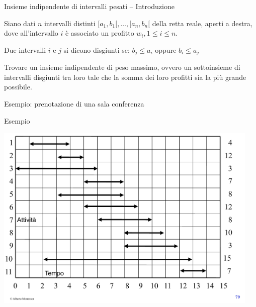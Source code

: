 \begin{frame}{Insieme indipendente di intervalli pesati -- Introduzione}

Siano dati $n$ intervalli distinti $[a_1, b_1[, \ldots, [a_n,b_n[$ della retta reale, aperti a destra, dove all’intervallo $i$ è associato un profitto $w_i, 1 \leq i \leq n$. 

\bigskip
{}
Due intervalli $i$ e $j$ si dicono \alert{disgiunti} se:  $b_j \leq a_i$  oppure  $b_i \leq a_j$

\bigskip
{}
Trovare un \alert{insieme indipendente di peso massimo}, ovvero un sottoinsieme di intervalli disgiunti tra loro tale che la somma dei loro profitti sia la più
grande possibile.
\BI
\item Esempio: prenotazione di una sala conferenza
\EI

\end{frame}

\begin{frame}{Esempio}

\vspace{-12pt}
\begin{center}
\includegraphics[width=0.95\textwidth,page=1]{intervalli-esempio.pdf}
\end{center}

\end{frame}

